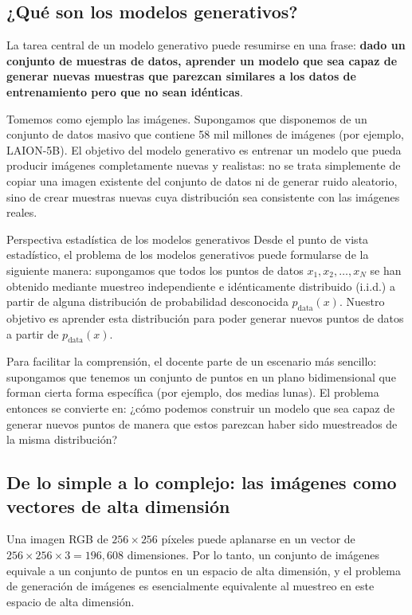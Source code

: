 \documentclass[a4paper]{article}
\begin{document}
\subsection{¿Qué son los modelos generativos?}

La tarea central de un modelo generativo puede resumirse en una frase: \textbf{dado un conjunto de muestras de datos, aprender un modelo que sea capaz de generar nuevas muestras que parezcan similares a los datos de entrenamiento pero que no sean idénticas}.

Tomemos como ejemplo las imágenes. Supongamos que disponemos de un conjunto de datos masivo que contiene 58 mil millones de imágenes (por ejemplo, LAION-5B). El objetivo del modelo generativo es entrenar un modelo que pueda producir imágenes completamente nuevas y realistas: no se trata simplemente de copiar una imagen existente del conjunto de datos ni de generar ruido aleatorio, sino de crear muestras nuevas cuya distribución sea consistente con las imágenes reales.

\begin{importantbox}{Perspectiva estadística de los modelos generativos}
Desde el punto de vista estadístico, el problema de los modelos generativos puede formularse de la siguiente manera: supongamos que todos los puntos de datos $x_1, x_2, \ldots, x_N$ se han obtenido mediante muestreo independiente e idénticamente distribuido (i.i.d.) a partir de alguna distribución de probabilidad desconocida $p_{\text{data}}(x)$. Nuestro objetivo es aprender esta distribución para poder generar nuevos puntos de datos a partir de $p_{\text{data}}(x)$.
\end{importantbox}

Para facilitar la comprensión, el docente parte de un escenario más sencillo: supongamos que tenemos un conjunto de puntos en un plano bidimensional que forman cierta forma específica (por ejemplo, dos medias lunas). El problema entonces se convierte en: ¿cómo podemos construir un modelo que sea capaz de generar nuevos puntos de manera que estos parezcan haber sido muestreados de la misma distribución?

\subsection{De lo simple a lo complejo: las imágenes como vectores de alta dimensión}

Una imagen RGB de $256 \times 256$ píxeles puede aplanarse en un vector de $256 \times 256 \times 3 = 196{,}608$ dimensiones. Por lo tanto, un conjunto de imágenes equivale a un conjunto de puntos en un espacio de alta dimensión, y el problema de generación de imágenes es esencialmente equivalente al muestreo en este espacio de alta dimensión.
\end{document}
